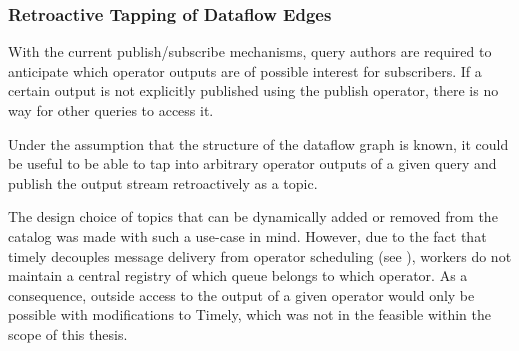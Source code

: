 \subsubsection{Retroactive Tapping of Dataflow Edges}
\begin{addedbar}
With the current publish/subscribe mechanisms, query authors are required to
anticipate which operator outputs are of possible interest for subscribers. If
a certain output is not explicitly published using the publish operator, there
is no way for other queries to access it.

Under the assumption that the structure of the dataflow graph is known, it could
be useful to be able to tap into arbitrary operator outputs of a given query and
publish the output stream retroactively as a topic.

The design choice of topics that can be dynamically added or removed
from the catalog was made with such a use-case in mind. However, due to the fact
that timely decouples message delivery from operator scheduling (see
), workers do not maintain a central registry of which
queue belongs to which operator. As a consequence, outside access to the output of
a given operator would only be possible with modifications to Timely, which was
not in the feasible within the scope of this thesis.

\end{addedbar}
